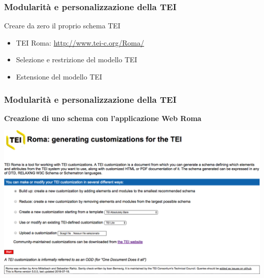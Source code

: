     \begin{frame}
        \frametitle{Modularità e personalizzazione della TEI}
        \addtocounter{nframe}{1}

        \begin{block}{Creare da zero il proprio schema TEI}
                \begin{itemize}
                    \item TEI Roma: \url{http://www.tei-c.org/Roma/}
                    \item Selezione e restrizione del modello TEI
                    \item Estensione del modello TEI
                \end{itemize} 
        \end{block}
        
    \end{frame}

    \begin{frame}
        \frametitle{Modularità e personalizzazione della TEI}
        \addtocounter{nframe}{1}
        
        \textbf{Creazione di uno schema con l'applicazione Web Roma}

         \begin{center}
            \includegraphics[width=.95\textwidth]{imgs/Roma1.png}
         \end{center}
       
        
    \end{frame}

